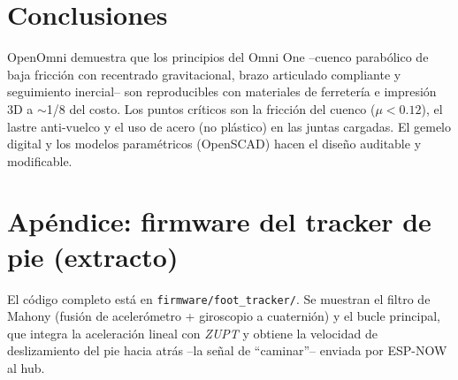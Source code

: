 \documentclass[10pt,twocolumn]{article}
\begin{document}
\section{Conclusiones}
OpenOmni demuestra que los principios del Omni One --cuenco parab\'olico de baja fricci\'on
con recentrado gravitacional, brazo articulado compliante y seguimiento inercial-- son
reproducibles con materiales de ferreter\'ia e impresi\'on 3D a $\sim$1/8 del costo. Los
puntos cr\'iticos son la fricci\'on del cuenco ($\mu<0.12$), el lastre anti-vuelco y el uso
de acero (no pl\'astico) en las juntas cargadas. El gemelo digital y los modelos
param\'etricos (OpenSCAD) hacen el dise\~no auditable y modificable.

\onecolumn
\section{Ap\'endice: firmware del tracker de pie (extracto)}
El c\'odigo completo est\'a en \texttt{firmware/foot\_tracker/}. Se muestran el filtro de
Mahony (fusi\'on de aceler\'ometro + giroscopio a cuaterni\'on) y el bucle principal, que
integra la aceleraci\'on lineal con \emph{ZUPT} y obtiene la velocidad de deslizamiento
del pie hacia atr\'as --la se\~nal de ``caminar''-- enviada por ESP-NOW al hub.
\end{document}
